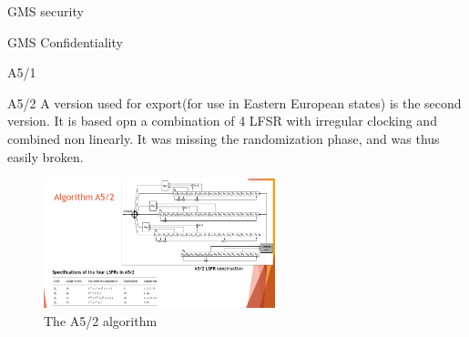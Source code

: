 \begin{section}{GMS security}
\begin{subsection}{GMS Confidentiality}
\begin{subsubsection}{A5/1}
      \end{subsubsection}
      \begin{subsubsection}{A5/2}
        A version used for export(for use in Eastern European states) is the second version. It is
        based opn a combination of 4 LFSR with irregular clocking and combined non linearly. It was
        missing the randomization phase, and was thus easily broken.

        \begin{figure}[H]
          \centering
          \includegraphics[width=0.6\textwidth]{img/wireless/a5-2.png}
          \caption{The A5/2 algorithm}
        \end{figure}
      \end{subsubsection}
    \end{subsection}
  \end{section}

